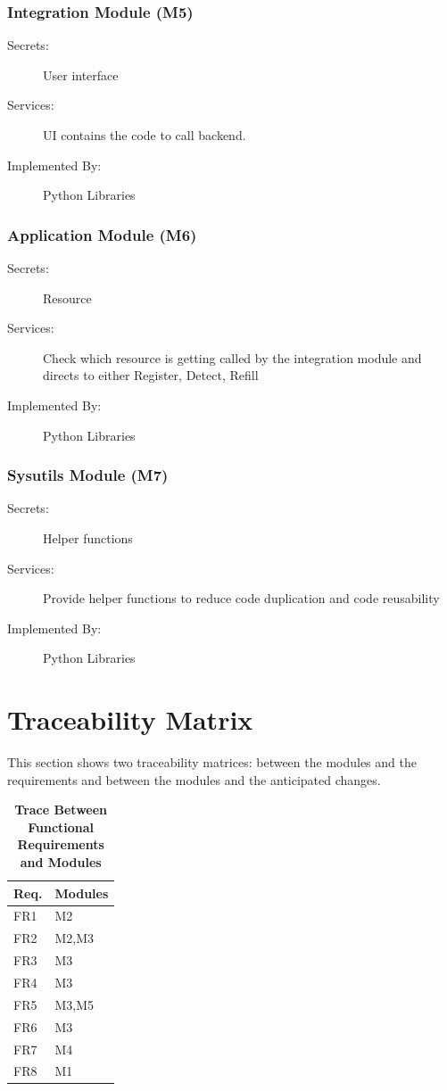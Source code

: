\documentclass[12pt, titlepage]{article}
\begin{document}
\subsubsection{Integration Module (M5)}
\begin{description}
\item[Secrets:] User interface
\item[Services:] UI contains the code to call backend.
\item[Implemented By:] Python Libraries
\end{description}

\subsubsection{Application Module (M6)}
\begin{description}
\item[Secrets:]Resource
\item[Services:] Check which resource is getting called by the integration module and directs to either Register, Detect, Refill
\item[Implemented By:] Python Libraries
\end{description}

\subsubsection{Sysutils Module (M7)}
\begin{description}
\item[Secrets:]Helper functions
\item[Services:]Provide helper functions to reduce code duplication and code reusability
\item[Implemented By:] Python Libraries
\end{description}


\section{Traceability Matrix} \label{SecTM}

This section shows two traceability matrices: between the modules and the
requirements and between the modules and the anticipated changes.

\begin{table}[H]
\centering
\begin{tabular}{p{} p{}}
\toprule
\textbf{Req.} & \textbf{Modules}\\
\midrule
FR1 & M2\\
FR2 & M2,M3\\
FR3 & M3\\
FR4 & M3\\
FR5 & M3,M5\\
FR6 & M3\\
FR7 & M4\\
FR8 & M1\\
\bottomrule
\end{tabular}
\caption{\bf Trace Between Functional Requirements and Modules}
\label{TblRT}
\end{table}
\end{document}

